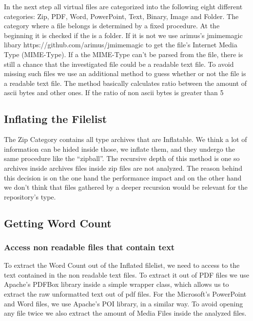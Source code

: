 \documentclass[paper=A4,pagesize=auto,12pt,headinclude=true,footinclude=true,BCOR=0mm,DIV=calc]{scrartcl}
\begin{document}
	In the next step all virtual files are categorized into the following eight different categories: Zip, PDF, Word, PowerPoint, Text, Binary, Image and Folder. The category where a file belongs is determined by a fixed procedure. 
	At the beginning it is checked if the is a folder. If it is not we use arimus’s jmimemagic libary https://github.com/arimus/jmimemagic to get the file’s Internet Media Type (MIME-Type). If a the MIME-Type can’t be parsed from the file, there is still a chance that the investigated file could be a readable text file. To avoid missing such files we use an additional method to guess whether or not the file is a readable text file. The method basically calculates ratio between the amount of ascii bytes and other ones. If the ratio of non ascii bytes is greater than 5%
	
	\subsection{Inflating the Filelist}
	
	The Zip Category contains all type archives that are Inflatable. We think a lot of information can be hided inside those, we inflate them, and they undergo the same procedure like the “zipball”. The recursive depth of this method is one so archives inside archives files inside zip files are not analyzed. The reason behind this decision is on the one hand the performance impact and on the other hand we don’t think that files gathered by a deeper recursion would be relevant for the repository’s type.
	
	\subsection{Getting Word Count}
	
	\subsubsection{ Access non readable files that contain text}
	To extract the Word Count out of the Inflated filelist, we need to access to the text contained in the non readable text files. To extract it out of PDF files we use Apache’s PDFBox library inside a simple wrapper class, which allows us to extract the raw unformatted text out of pdf files. For the Microsoft’s PowerPoint and Word files, we use Apache’s POI library, in a similar way.
	To avoid opening any file twice we also extract the amount of Media Files inside the analyzed files. 
	
\end{document}
